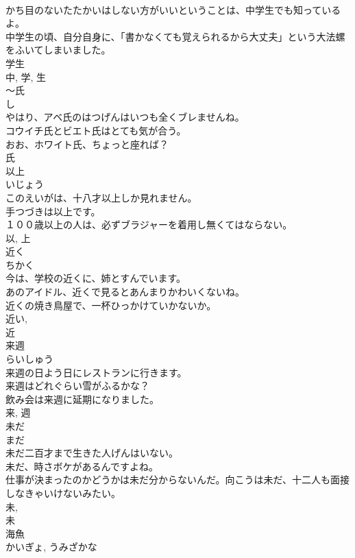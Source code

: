 \documentclass[8pt]{extreport}
\begin{document}
\begin{CJK}{UTF8}{min}
\\	かち目のないたたかいはしない方がいいということは、中学生でも知っているよ。	
\\	中学生の頃、自分自身に、「書かなくても覚えられるから大丈夫」という大法螺をふいてしまいました。	
\\	学生 
\\	中, 学, 生	
\\	〜氏	
\\	し	
\\	やはり、アベ氏のはつげんはいつも全くブレませんね。	
\\	コウイチ氏とビエト氏はとても気が合う。	
\\	おお、ホワイト氏、ちょっと座れば？	
\\	氏	
\\	以上	
\\	いじょう	
\\	このえいがは、十八才以上しか見れません。	
\\	手つづきは以上です。	
\\	１００歳以上の人は、必ずブラジャーを着用し無くてはならない。	
\\	以, 上	
\\	近く	
\\	ちかく	
\\	今は、学校の近くに、姉とすんでいます。	
\\	あのアイドル、近くで見るとあんまりかわいくないね。	
\\	近くの焼き鳥屋で、一杯ひっかけていかないか。	
\\	近い, 
\\	近	
\\	来週	
\\	らいしゅう	
\\	来週の日よう日にレストランに行きます。	
\\	来週はどれぐらい雪がふるかな？	
\\	飲み会は来週に延期になりました。	
\\	来, 週	
\\	未だ	
\\	まだ	
\\	未だ二百才まで生きた人げんはいない。	
\\	未だ、時さボケがあるんですよね。	
\\	仕事が決まったのかどうかは未だ分からないんだ。向こうは未だ、十二人も面接しなきゃいけないみたい。	
\\	未, 
\\	未	
\\	海魚	
\\	かいぎょ, うみざかな	

\end{CJK}
\end{document}
